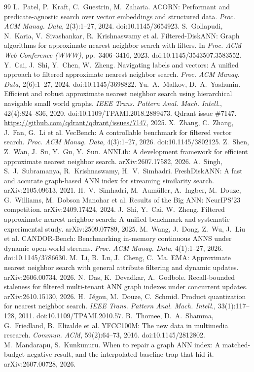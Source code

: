 \documentclass[10pt,a4paper]{article}
\begin{document}
\small
\begin{thebibliography}{99}
 L.~Patel, P.~Kraft, C.~Guestrin, M.~Zaharia. ACORN: Performant and predicate-agnostic search over vector embeddings and structured data. \emph{Proc. ACM Manag. Data}, 2(3):1--27, 2024. doi:10.1145/3654923.
 S.~Gollapudi, N.~Karia, V.~Sivashankar, R.~Krishnaswamy et al. Filtered-DiskANN: Graph algorithms for approximate nearest neighbor search with filters. In \emph{Proc. ACM Web Conference (WWW)}, pp.~3406--3416, 2023. doi:10.1145/3543507.3583552.
 Y.~Cai, J.~Shi, Y.~Chen, W.~Zheng. Navigating labels and vectors: A unified approach to filtered approximate nearest neighbor search. \emph{Proc. ACM Manag. Data}, 2(6):1--27, 2024. doi:10.1145/3698822.
 Yu.~A.~Malkov, D.~A.~Yashunin. Efficient and robust approximate nearest neighbor search using hierarchical navigable small world graphs. \emph{IEEE Trans. Pattern Anal. Mach. Intell.}, 42(4):824--836, 2020. doi:10.1109/TPAMI.2018.2889473.
 Qdrant issue \#7147. \url{https://github.com/qdrant/qdrant/issues/7147}, 2025.
 X.~Zhang, C.~Zhang, J.~Fan, G.~Li et al. VecBench: A controllable benchmark for filtered vector search. \emph{Proc. ACM Manag. Data}, 4(3):1--27, 2026. doi:10.1145/3802125.
 Z.~Shen, Z.~Wan, J.~Su, Y.~Gu, Y.~Sun. ANNLib: A development framework for efficient approximate nearest neighbor search. arXiv:2607.17582, 2026.
 A.~Singh, S.~J.~Subramanya, R.~Krishnaswamy, H.~V.~Simhadri. FreshDiskANN: A fast and accurate graph-based ANN index for streaming similarity search. arXiv:2105.09613, 2021.
 H.~V.~Simhadri, M.~Aum\"uller, A.~Ingber, M.~Douze, G.~Williams, M.~Dobson Manohar et al. Results of the Big ANN: NeurIPS'23 competition. arXiv:2409.17424, 2024.
 J.~Shi, Y.~Cai, W.~Zheng. Filtered approximate nearest neighbor search: A unified benchmark and systematic experimental study. arXiv:2509.07789, 2025.
 M.~Wang, J.~Dong, Z.~Wu, J.~Liu et al. CANDOR-Bench: Benchmarking in-memory continuous ANNS under dynamic open-world streams. \emph{Proc. ACM Manag. Data}, 4(1):1--27, 2026. doi:10.1145/3786630.
 M.~Li, B.~Lu, J.~Cheng, C.~Ma. EMA: Approximate nearest neighbor search with general attribute filtering and dynamic updates. arXiv:2606.00734, 2026.
 N.~Das, K.~Devadkar, A.~Godbole. Recall-bounded staleness for filtered multi-tenant ANN graph indexes under concurrent updates. arXiv:2610.15130, 2026.
 H.~J\'egou, M.~Douze, C.~Schmid. Product quantization for nearest neighbor search. \emph{IEEE Trans. Pattern Anal. Mach. Intell.}, 33(1):117--128, 2011. doi:10.1109/TPAMI.2010.57.
 B.~Thomee, D.~A.~Shamma, G.~Friedland, B.~Elizalde et al. YFCC100M: The new data in multimedia research. \emph{Commun. ACM}, 59(2):64--73, 2016. doi:10.1145/2812802.
 M.~Mandarapu, S.~Kunkunuru. When to repair a graph ANN index: A matched-budget negative result, and the interpolated-baseline trap that hid it. arXiv:2607.00728, 2026.
\end{thebibliography}
\end{document}
